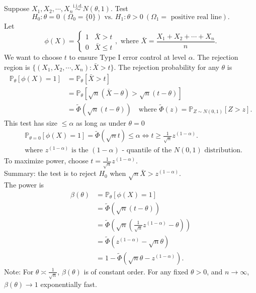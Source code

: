 \documentclass[a4paper]{article}
\begin{document}
\begin{eg}
	Suppose $X_1, X_2, \cdots, X_n \stackrel{\text{i.i.d.}}{\sim} N(\theta,1)$. Test
	\begin{equation*}
		H_0: \theta = 0 \ (\Omega_0 = \{0\}) \text{ vs. } H_1: \theta > 0 \ (\Omega_1 = \text{ positive real line}).
	\end{equation*}
	Let
	\begin{equation*}
		\phi (X) =\left\{ 
		\begin{array}{ll}
			1 & \bar{X} > t \\
			0 & \bar{X} \leq t
		\end{array} \right., \text{ where } \bar{X} = \frac{X_1 + X_2 + \cdots + X_n}{n}.
	\end{equation*}
	We want to choose $t$ to ensure Type I error control at level $\alpha$. The rejection region is $\{(X_1,X_2,\cdots,X_n): \bar{X} > t\}$. The rejection probability for any $\theta$ is
	\begin{equation}
		\begin{aligned}
			\mathbb{P}_\theta[\phi(X) = 1] &= \mathbb{P}_\theta[\bar{X} > t] \\
			&= \mathbb{P}_\theta[\sqrt{n}(\bar{X}-\theta) > \sqrt{n}(t-\theta)] \\
			&= \tilde{\Phi}(\sqrt{n}(t-\theta)) \quad \text{where } \tilde{\Phi}(z) = \mathbb{P}_{Z \sim N(0,1)}[Z > z].
		\end{aligned}
	\end{equation}
	This test has size $\leq \alpha$ as long as under $\theta = 0$
	\begin{equation}
		\begin{aligned}
			& \mathbb{P}_{\theta = 0}[\phi(X) = 1] = \tilde{\Phi}(\sqrt{n}t) \leq \alpha \iff t \geq \frac{1}{\sqrt{n}} z^{(1-\alpha)}. \\
			& \text{where $z^{(1-\alpha)}$ is the $(1-\alpha)$ - quantile of the $N(0,1)$ distribution.}
		\end{aligned}
	\end{equation}
	To maximize power, choose $t = \frac{1}{\sqrt{n}}z^{(1-\alpha)}$.\\
	Summary: the test is to reject $H_0$ when $\sqrt{n}\bar{X} > z^{(1-\alpha)}$.\\
	The power is
	\begin{equation}
		\begin{aligned}
			\beta(\theta) &= \mathbb{P}_\theta[\phi(X) = 1] \\
			&= \tilde{\Phi}(\sqrt{n}(t-\theta)) \\
			&= \tilde{\Phi}(\sqrt{n}(\frac{1}{\sqrt{n}} z^{(1-\alpha)} - \theta)) \\
			&= \tilde{\Phi}(z^{(1-\alpha)} - \sqrt{n}\theta) \\
			&= 1- \tilde{\Phi}(\sqrt{n}\theta - z^{(1-\alpha)}).
		\end{aligned}
	\end{equation}
	Note: For $\theta \asymp \frac{1}{\sqrt{n}}$, $\beta(\theta)$ is of constant order. For any fixed $\theta > 0$, and $n \to \infty$, $\beta(\theta) \to 1$ exponentially fast.
\end{eg}
\end{document}

